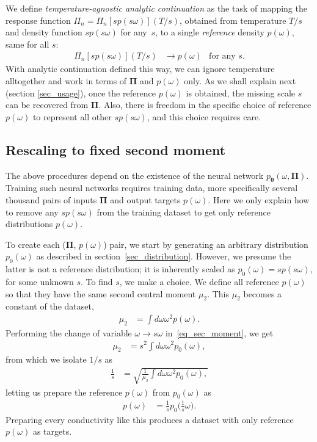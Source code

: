 \documentclass[notitlepage,11pt,nofootinbib]{revtex4-1}
\renewcommand{\vec}[1]{\bm{#1}}
\begin{document}
We define \emph{temperature-agnostic analytic continuation} as the task of mapping the response function $\Pi_n = \Pi_n[sp(s\omega)](T/s)$, obtained from temperature $T/s$ and density function $sp(s\omega)$ for any~$s$, to a single \emph{reference} density $p(\omega)$, same for all $s$:
\begin{align}
    \Pi_n[sp(s\omega)](T/s) &\longrightarrow p(\omega) &\text{for any }s.
    \label{eq_agnostic_ac}
\end{align}
With analytic continuation defined this way, we can ignore temperature alltogether and work in terms of $\vec \Pi$ and $p(\omega)$ only.
As we shall explain next (section \ref{sec_usage}), once the reference $p(\omega)$ is obtained, the missing scale $s$ can be recovered from $\vec \Pi$.
Also, there is freedom in the specific choice of reference $p(\omega)$ to represent all other $sp(s\omega)$, and this choice requires care.


\subsection{Rescaling to fixed second moment}
\label{sec_data_rescaling}
The above procedures depend on the existence of the neural network $p_{\vec \theta}(\omega, \vec \Pi)$. Training such neural networks requires training data, more specifically several thousand pairs of inputs $\vec \Pi$ and output targets $p(\omega)$. Here we only explain how to remove any $sp(s\omega)$ from the training dataset to get only reference distributions $p(\omega)$.

To create each ($\vec \Pi$, $p(\omega)$) pair, we start by generating an arbitrary distribution $p_0(\omega)$ as described in section~\ref{sec_distribution}. However, we presume the latter is not a reference distribution; it is inherently scaled as $p_0(\omega)=sp(s\omega)$, for some unknown $s$.
To find $s$, we make a choice. We define all reference $p(\omega)$ so that they have the same second central moment $\mu_2$. This $\mu_2$ becomes a constant of the dataset,
\begin{align}
\mu_2
&=
\int d\omega \omega^2 p(\omega).
\label{eq_sec_moment}
\end{align}
Performing the change of variable $\omega \rightarrow s\omega$ in~\eqref{eq_sec_moment}, we get
\begin{align}
\mu_2&=
s^2 \int d\omega \omega^2 p_0(\omega),
\end{align}
from which we isolate $1/s$ as
\begin{align}
\frac{1}{s}
&=
\sqrt{
\frac{1}{\mu_2}
\int d\omega \omega^2 p_0(\omega),
}
\end{align}
letting us prepare the reference $p(\omega)$ from $p_0(\omega)$ as
\begin{align}
p(\omega) 
&=
\frac{1}{s}p_0\big(\frac{1}{s}\omega\big).
\end{align}
Preparing every conductivity like this produces a dataset with only reference $p(\omega)$ as targets.
\end{document}
